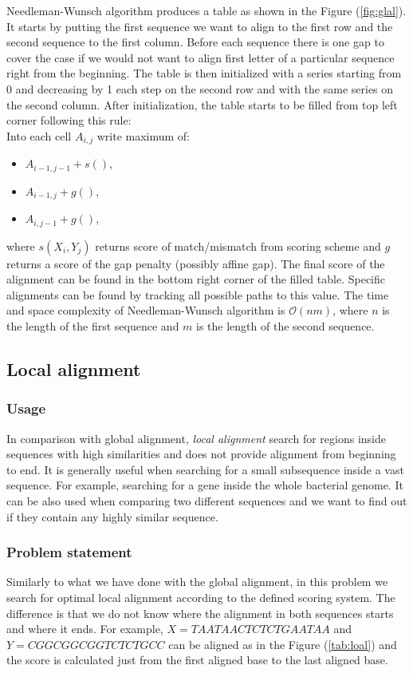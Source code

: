 Needleman-Wunsch algorithm produces a table as shown in the Figure (\ref{fig:glal}).
It starts by putting the first sequence we want to align to the first row and the second sequence to the first column.
Before each sequence there is one gap to cover the case if we would not want to align first letter of a particular sequence right from the beginning.
The table is then initialized with a series starting from 0 and decreasing by 1 each step on the second row and with the same series on the second column.
After initialization, the table starts to be filled from top left corner following this rule:\\
Into each cell $A_{i,j}$ write maximum of:
\begin{itemize}
\item $A_{i-1, j-1} + s()$,
\item $A_{i-1, j} + g()$,
\item $A_{i, j-1} + g()$,
\end{itemize}
where $s(X_i, Y_j)$ returns score of match/mismatch from scoring scheme and $g$ returns a score of the gap penalty (possibly affine gap).
The final score of the alignment can be found in the bottom right corner of the filled table.
Specific alignments can be found by tracking all possible paths to this value.
The time and space complexity of Needleman-Wunsch algorithm is $\mathcal{O}(nm)$, where $n$ is the length of the first sequence and $m$ is the length of the second sequence.

\subsection{Local alignment}
\subsubsection{Usage}
In comparison with global alignment, \emph{local alignment} search for regions inside sequences with high similarities and does not provide alignment from beginning to end.
It is generally useful when searching for a small subsequence inside a vast sequence.
For example, searching for a gene inside the whole bacterial genome.
It can be also used when comparing two different sequences and we want to find out if they contain any highly similar sequence.

\subsubsection{Problem statement}
Similarly to what we have done with the global alignment, in this problem we search for optimal local alignment according to the defined scoring system.
The difference is that we do not know where the alignment in both sequences starts and where it ends.
For example, $ X = TAATAACTCTCTGAATAA $ and $ Y = CGGCGGCGGTCTCTGCC $ can be aligned as in the Figure (\ref{tab:loal}) and the score is calculated just from the first aligned base to the last aligned base.

